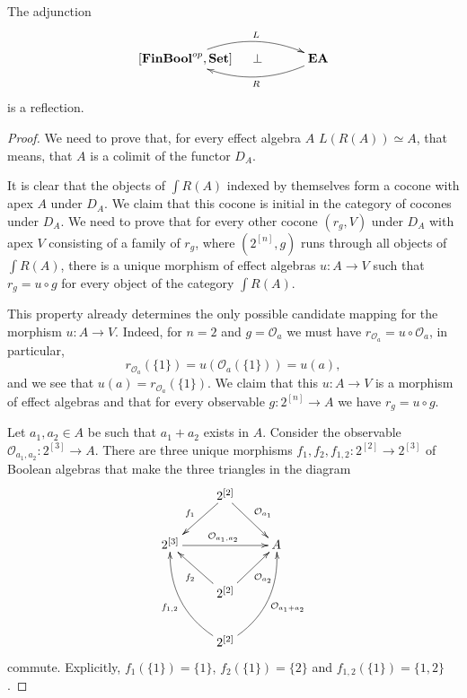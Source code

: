 \documentclass[smallextended]{svjour3}
\begin{document}
\begin{theorem}
\label{thm:density}

The adjunction 
$$
\xymatrix{
[{\mathbf{FinBool}}^{op},{\mathbf{Set}}]
	\ar@/^1.2pc/[rr]^-L
&
\hspace*{-2em}\bot
&
{\mathbf{EA}}
	\ar@/^1.2pc/[ll]^-R
}
$$
 is a reflection.
 \end{theorem}
\begin{proof}
We need to prove that, for every effect algebra $A$ $L(R(A))\simeq A$,
that means, that $A$ is a colimit of the functor $D_A$.

It is clear that the objects of 
${\int R({A})}$ indexed by themselves form a cocone with apex $A$ under $D_A$. We claim
that this cocone is initial in the category of cocones under $D_A$. We need to prove that for every other
cocone $(r_g,V)$ under $D_A$ with apex $V$ consisting of a family of 
$r_{g}$, where $(2^{[n]},g)$ runs through all objects of ${\int R({A})}$,
there is a unique morphism of effect algebras $u:A\to V$ such that $r_{g}=u\circ g$
for every object of the category ${\int R({A})}$.

This property already determines the only possible candidate mapping for the morphism $u:A\to V$. Indeed,
for $n=2$ and $g={\mathcal O_{{a}}}$ we must have
$r_{{\mathcal O_{{a}}}}=u\circ {\mathcal O_{{a}}}$, in particular,
$$
r_{{\mathcal O_{{a}}}}(\{1\})=u({\mathcal O_{{a}}}(\{1\}))=u(a),
$$
and we see that $u(a)=r_{{\mathcal O_{{a}}}}(\{1\})$. 
We claim that this $u:A\to V$ is a morphism of effect algebras and that for
every observable $g:2^{[n]}\to A$ we have $r_{g}=u\circ g$.

Let $a_1,a_2\in A$ be such that $a_1+a_2$ exists in $A$. Consider the observable 
${\mathcal O_{{a_1,a_2}}}:2^{[3]}\to A$.
There are three unique morphisms $f_1,f_2,f_{1,2}:2^{[2]}\to2^{[3]}$ of Boolean algebras
that make the three triangles in the diagram
\begin{equation}
\label{diag:summation}
\xymatrix{
~
&
2^{[2]}
	\ar[ld]_{f_1}
	\ar[rd]^{{\mathcal O_{{a_1}}}}
\\
2^{[3]}
	\ar[rr]^{{\mathcal O_{{a_1,a_2}}}}
&
~
&
A
\\
&
2^{[2]}
	\ar[lu]^{f_2}
	\ar[ru]_{{\mathcal O_{{a_2}}}}
\\
~
&
2^{[2]}
	\ar@/^1.2pc/[luu]^{f_{1,2}}
	\ar@/_1.2pc/[ruu]_{{\mathcal O_{{a_1+a_2}}}}
}
\end{equation}
commute. Explicitly, 
$f_1(\{1\})=\{1\}$, $f_2(\{1\})=\{2\}$ and $f_{1,2}(\{1\})=\{1,2\}$.


\end{proof}
\end{document}

